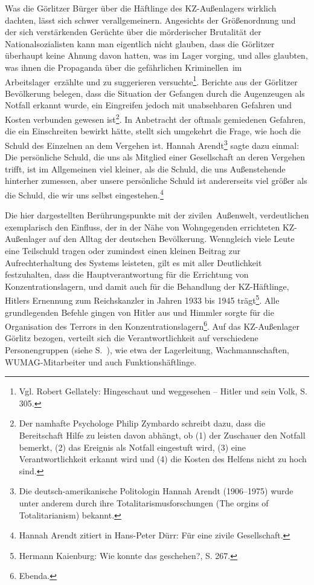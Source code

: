 \documentclass[a4paper,12pt,ngerman,
]{nisebook}
\begin{document}
Was die Görlitzer Bürger über die Häftlinge des KZ-Außenlagers wirklich dachten, lässt sich schwer verallgemeinern.
Angesichts der Größenordnung und der sich verstärkenden Gerüchte über die mörderischer Brutalität der Nationalsozialisten kann man eigentlich nicht glauben, dass die Görlitzer überhaupt keine Ahnung davon hatten, was im Lager vorging, und alles glaubten, was ihnen die Propaganda über die \glqq gefährlichen Kriminellen\grqq~im \glqq Arbeitslager\grqq~erzählte und zu suggerieren versuchte\footnote{Vgl. Robert Gellately: Hingeschaut und weggesehen -- Hitler und sein Volk, S. 305.}. Berichte aus der Görlitzer Bevölkerung belegen, dass die Situation der Gefangen durch die Augenzeugen als Notfall erkannt wurde, ein Eingreifen jedoch mit unabsehbaren Gefahren und Kosten verbunden gewesen ist\footnote{Der namhafte Psychologe Philip Zymbardo schreibt dazu, dass die Bereitschaft Hilfe zu leisten davon abhängt, ob (1) der Zuschauer den Notfall bemerkt, (2) das Ereignis als Notfall eingestuft wird, (3) eine Verantwortlichkeit erkannt wird und (4) die Kosten des Helfens nicht zu hoch sind.}.
In Anbetracht der oftmals gemiedenen Gefahren, die ein Einschreiten bewirkt hätte, stellt sich umgekehrt die Frage, wie hoch die Schuld des Einzelnen an dem Vergehen ist. Hannah Arendt\footnote{Die deutsch-amerikanische Politologin Hannah Arendt (1906--1975) wurde unter anderem durch ihre Totalitarismusforschungen (\glqq The orgins of Totalitarianism\grqq) bekannt.} sagte dazu einmal:
 \glqq Die persönliche Schuld, die uns als Mitglied einer Gesellschaft an deren Vergehen trifft, ist im Allgemeinen viel kleiner, als die Schuld, die uns Außenstehende hinterher zumessen, aber unsere persönliche Schuld ist andererseits viel größer als die Schuld, die wir uns selbst eingestehen.\grqq\footnote{Hannah Arendt zitiert in Hans-Peter Dürr: \glqq Für eine zivile Gesellschaft\grqq.}

Die hier dargestellten Berührungspunkte mit der \glqq zivilen\grqq~Außenwelt, verdeutlichen exemplarisch den Einfluss, der in der Nähe von Wohngegenden errichteten KZ-Außenlager auf den Alltag der deutschen Bevölkerung.
Wenngleich viele Leute eine Teilschuld tragen oder zumindest einen kleinen Beitrag zur Aufrechterhaltung des Systems leisteten, gilt es mit aller Deutlichkeit festzuhalten, dass die Hauptverantwortung für die Errichtung von Konzentrationslagern, und damit auch für die Behandlung der KZ-Häftlinge, Hitlers Ernennung zum Reichskanzler in Jahren 1933 bis 1945 trägt\footnote{Hermann Kaienburg: Wie konnte das geschehen?, S. 267.}. Alle grundlegenden Befehle gingen von Hitler aus und Himmler sorgte für die Organisation des Terrors in den Konzentrationslagern\footnote{Ebenda.}. Auf das KZ-Außenlager Görlitz bezogen, verteilt sich die Verantwortlichkeit auf verschiedene Personengruppen (siehe S.~\pageref{ns-verbrechen}), wie etwa der Lagerleitung, Wachmannschaften, WUMAG-Mitarbeiter und auch Funktionshäftlinge.
\end{document}

